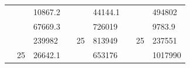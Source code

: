 \begin{table}[]
\begin{tabular}{|cclccllll}
\rowcolor[HTML]{DAE8FC} 
\multicolumn{1}{|c|}{\cellcolor[HTML]{FFFFC7}}                                & \multicolumn{1}{c|}{\cellcolor[HTML]{DAE8FC}}                      & \multicolumn{1}{l|}{\cellcolor[HTML]{DAE8FC}10867.2}   & \multicolumn{1}{c|}{\cellcolor[HTML]{FFFFC7}}                                & \multicolumn{1}{c|}{\cellcolor[HTML]{DAE8FC}}                       & \multicolumn{1}{l|}{\cellcolor[HTML]{DAE8FC}44144.1}   & \multicolumn{1}{c|}{\cellcolor[HTML]{FFFFC7}}                                & \multicolumn{1}{c|}{\cellcolor[HTML]{DAE8FC}}                      & \multicolumn{1}{l|}{\cellcolor[HTML]{DAE8FC}494802}    \\ \cline{3-3} \cline{6-6} \cline{9-9} 
\multicolumn{1}{|c|}{\cellcolor[HTML]{FFFFC7}}                                & \multicolumn{1}{c|}{\cellcolor[HTML]{DAE8FC}}                      & \multicolumn{1}{l|}{\cellcolor[HTML]{DDFDFF}67669.3}   & \multicolumn{1}{c|}{\cellcolor[HTML]{FFFFC7}}                                & \multicolumn{1}{c|}{\cellcolor[HTML]{DAE8FC}}                       & \multicolumn{1}{l|}{\cellcolor[HTML]{DDFDFF}726019}    & \multicolumn{1}{c|}{\cellcolor[HTML]{FFFFC7}}                                & \multicolumn{1}{c|}{\cellcolor[HTML]{DAE8FC}}                      & \multicolumn{1}{l|}{\cellcolor[HTML]{DDFDFF}9783.9}    \\ \cline{3-3} \cline{6-6} \cline{9-9} 
\rowcolor[HTML]{DAE8FC} 
\multicolumn{1}{|c|}{\cellcolor[HTML]{FFFFC7}}                                & \multicolumn{1}{c|}{\cellcolor[HTML]{DAE8FC}}                      & \multicolumn{1}{l|}{\cellcolor[HTML]{DAE8FC}239982}    & \multicolumn{1}{c|}{\cellcolor[HTML]{FFFFC7}}                                & \multicolumn{1}{c|}{\multirow{-9}{*}{\cellcolor[HTML]{DAE8FC}25}}   & \multicolumn{1}{l|}{\cellcolor[HTML]{DAE8FC}813949}    & \multicolumn{1}{c|}{\cellcolor[HTML]{FFFFC7}}                                & \multicolumn{1}{c|}{\multirow{-9}{*}{\cellcolor[HTML]{DAE8FC}25}}  & \multicolumn{1}{l|}{\cellcolor[HTML]{DAE8FC}237551}    \\ \cline{3-3} \cline{5-6} \cline{8-9} 
\multicolumn{1}{|c|}{\cellcolor[HTML]{FFFFC7}}                                & \multicolumn{1}{c|}{\multirow{-10}{*}{\cellcolor[HTML]{DAE8FC}25}} & \multicolumn{1}{l|}{\cellcolor[HTML]{DDFDFF}26642.1}   & \multicolumn{1}{c|}{\cellcolor[HTML]{FFFFC7}}                                & \multicolumn{1}{c|}{\cellcolor[HTML]{DDFDFF}}                       & \multicolumn{1}{l|}{\cellcolor[HTML]{DAE8FC}653176}    & \multicolumn{1}{c|}{\cellcolor[HTML]{FFFFC7}}                                & \multicolumn{1}{c|}{\cellcolor[HTML]{DDFDFF}}                      & \multicolumn{1}{l|}{\cellcolor[HTML]{DAE8FC}1017990}   \\ \cline{2-3} \cline{6-6} \cline{9-9} 

\end{tabular}
\end{table}
